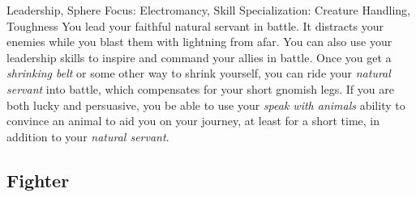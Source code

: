              Leadership, Sphere Focus: Electromancy, Skill Specialization: Creature Handling, Toughness
             You lead your faithful natural servant in battle.
            It distracts your enemies while you blast them with lightning from afar.
            You can also use your leadership skills to inspire and command your allies in battle.
            Once you get a \textit{shrinking belt} or some other way to shrink yourself, you can ride your \textit{natural servant} into battle, which compensates for your short gnomish legs.
            If you are both lucky and persuasive, you be able to use your \textit{speak with animals} ability to convince an animal to aid you on your journey, at least for a short time, in addition to your \textit{natural servant}.

    \subsection{Fighter}

